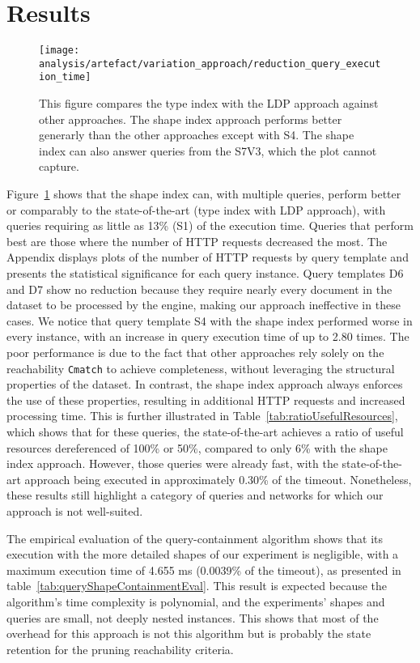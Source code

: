 \section{Results}

\begin{figure}[h]
    \centering
    \texttt{[image: analysis/artefact/variation\_approach/reduction\_query\_execution\_time]}
    \caption{
        This figure compares the type index with the LDP approach against other approaches.
        The shape index approach performs better generarly than the other approaches except with S4.
        The shape index can also answer queries from the S7V3, which the plot cannot capture.
    }
    \label{fig:compApproach}
\end{figure}


Figure~\ref{fig:compApproach} shows that the shape index can, with multiple queries, perform better or comparably to the state-of-the-art (type index with LDP approach), with queries requiring as little as 13\% (S1) of the execution time.
Queries that perform best are those where the number of HTTP requests decreased the most.
The Appendix displays plots of the number of HTTP requests by query template and presents the statistical significance for each query instance.
Query templates D6 and D7 show no reduction because they require nearly every document in the dataset to be processed by the engine, making our approach ineffective in these cases.
We notice that query template S4 with the shape index performed worse in every instance, with an increase in query execution time of up to 2.80 times.
The poor performance is due to the fact that other approaches rely solely on the reachability \texttt{Cmatch} to achieve completeness, without leveraging the structural properties of the dataset. 
In contrast, the shape index approach always enforces the use of these properties, resulting in additional HTTP requests and increased processing time.
This is further illustrated in Table~\ref{tab:ratioUsefulResources}, which shows that for these queries, the state-of-the-art achieves a ratio of useful resources dereferenced of 100\% or 50\%, compared to only 6\% with the shape index approach.
However, those queries were already fast, with the state-of-the-art approach being executed in approximately 0.30\% of the timeout.
Nonetheless, these results still highlight a category of queries and networks for which our approach is not well-suited.

The empirical evaluation of the query-containment algorithm shows that its execution with the more detailed shapes of our experiment is negligible, with a maximum execution time of 4.655 ms (0.0039\% of the timeout), as presented in table~\ref{tab:queryShapeContainmentEval}.
This result is expected because the algorithm's time complexity is polynomial, and the experiments' shapes and queries are small, not deeply nested instances.
This shows that most of the overhead for this approach is not this algorithm but is probably the state retention for the pruning reachability criteria.

